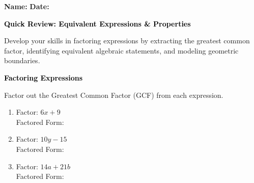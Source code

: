 \documentclass[12pt, letterpaper, fleqn]{article}
\newcommand{\blanklong}{\underline{\hspace{6.5cm}}}
\begin{document}
\textbf{Name:} \underline{\hspace{5cm}}
\hfill
\textbf{Date:} \underline{\hspace{3cm}}\\

\begin{tcolorbox}[colback=black!10]
    \large\textcolor{black}{\textbf{Quick Review: Equivalent Expressions \& Properties}}
\end{tcolorbox}

\vspace{3mm}
\noindent
Develop your skills in factoring expressions by extracting the greatest common factor, identifying equivalent algebraic statements, and modeling geometric boundaries.

\vspace{4mm}

\begin{tcolorbox}[colback=black!10]
\large\textcolor{black}{\textbf{Factoring Expressions}}
\end{tcolorbox}

\noindent
Factor out the Greatest Common Factor (GCF) from each expression.

\vspace{3mm}

\begin{enumerate}[itemsep=2.2cm, leftmargin=0.6cm]

\item Factor: $6x + 9$ \\
Factored Form: \blanklong

\vspace{2cm}

\item Factor: $10y - 15$ \\
Factored Form: \blanklong

\vspace{2cm}

\item Factor: $14a + 21b$ \\
Factored Form: \blanklong

\vspace{2cm}

\end{enumerate}
\end{document}
